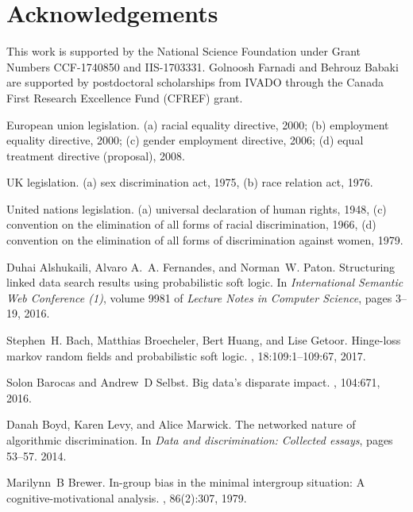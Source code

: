 \documentclass[11pt]{article}
\begin{document}
\section*{Acknowledgements}
This work is supported by the National Science Foundation under Grant Numbers CCF-1740850 and IIS-1703331. Golnoosh Farnadi and Behrouz Babaki are  supported by postdoctoral scholarships from IVADO through the Canada First Research Excellence Fund (CFREF) grant.

\begin{thebibliography}{10}
\itemsep=1pt 
\begin{small}

European union legislation. (a) racial equality directive, 2000; (b) employment
  equality directive, 2000; (c) gender employment directive, 2006; (d) equal
  treatment directive (proposal), 2008.

{UK} legislation. (a) sex discrimination act, 1975, (b) race relation act,
  1976.

United nations legislation. (a) universal declaration of human rights, 1948,
  (c) convention on the elimination of all forms of racial discrimination,
  1966, (d) convention on the elimination of all forms of discrimination
  against women, 1979.

Duhai Alshukaili, Alvaro A.~A. Fernandes, and Norman~W. Paton.
\newblock Structuring linked data search results using probabilistic soft
  logic.
\newblock In {\em International Semantic Web Conference {(1)}}, volume 9981 of
  {\em Lecture Notes in Computer Science}, pages 3--19, 2016.

Stephen~H. Bach, Matthias Broecheler, Bert Huang, and Lise Getoor.
\newblock Hinge-loss markov random fields and probabilistic soft logic.
, 18:109:1--109:67, 2017.

Solon Barocas and Andrew~D Selbst.
\newblock Big data's disparate impact.
, 104:671, 2016.

Danah Boyd, Karen Levy, and Alice Marwick.
\newblock The networked nature of algorithmic discrimination.
\newblock In {\em Data and discrimination: Collected essays}, pages 53--57.
  2014.

Marilynn~B Brewer.
\newblock In-group bias in the minimal intergroup situation: A
  cognitive-motivational analysis.
, 86(2):307, 1979.


\end{small}
\end{thebibliography}
\end{document}
